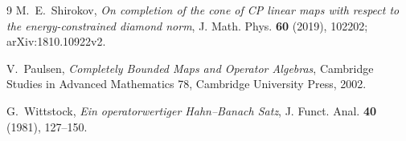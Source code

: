 \documentclass[11pt]{article}
\begin{document}
\begin{thebibliography}{9}
M.~E.~Shirokov,
\emph{On completion of the cone of CP linear maps with respect to the
energy-constrained diamond norm},
J. Math. Phys. \textbf{60} (2019), 102202; arXiv:1810.10922v2.

V.~Paulsen,
\emph{Completely Bounded Maps and Operator Algebras},
Cambridge Studies in Advanced Mathematics 78, Cambridge University Press,
2002.

G.~Wittstock,
\emph{Ein operatorwertiger Hahn--Banach Satz},
J. Funct. Anal. \textbf{40} (1981), 127--150.
\end{thebibliography}
\end{document}
